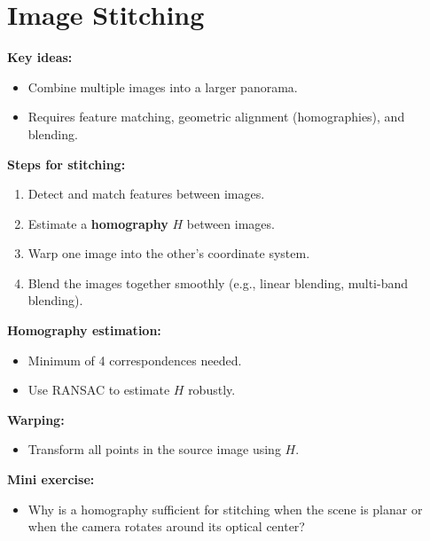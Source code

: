 \documentclass[a4paper,11pt]{article}
\begin{document}
\newpage
\section{Image Stitching}

\textbf{Key ideas:}
\begin{itemize}
    \item Combine multiple images into a larger panorama.
    \item Requires feature matching, geometric alignment (homographies), and blending.
\end{itemize}

\textbf{Steps for stitching:}
\begin{enumerate}
    \item Detect and match features between images.
    \item Estimate a \textbf{homography} $H$ between images.
    \item Warp one image into the other's coordinate system.
    \item Blend the images together smoothly (e.g., linear blending, multi-band blending).
\end{enumerate}

\textbf{Homography estimation:}
\begin{itemize}
    \item Minimum of 4 correspondences needed.
    \item Use RANSAC to estimate $H$ robustly.
\end{itemize}

\textbf{Warping:}
\begin{itemize}
    \item Transform all points in the source image using $H$.
\end{itemize}

\textbf{Mini exercise:}
\begin{itemize}
    \item Why is a homography sufficient for stitching when the scene is planar or when the camera rotates around its optical center?
\end{itemize}

\vspace{1em}
\end{document}
